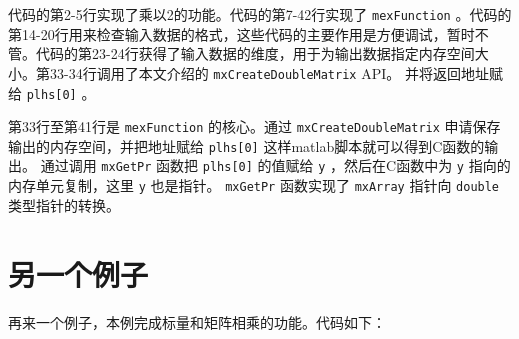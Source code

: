 \documentclass[10pt,a4paper,UTF8]{article}
\begin{document}
代码的第2-5行实现了乘以2的功能。代码的第7-42行实现了 \texttt{mexFunction} 。代码的第14-20行用来检查输入数据的格式，这些代码的主要作用是方便调试，暂时不管。代码的第23-24行获得了输入数据的维度，用于为输出数据指定内存空间大小。第33-34行调用了本文介绍的 \texttt{mxCreateDoubleMatrix} API。 并将返回地址赋给 \texttt{plhs[0]} 。

第33行至第41行是 \texttt{mexFunction} 的核心。通过 \texttt{mxCreateDoubleMatrix} 申请保存输出的内存空间，并把地址赋给 \texttt{plhs[0]} 这样matlab脚本就可以得到C函数的输出。 通过调用 \texttt{mxGetPr} 函数把 \texttt{plhs[0]} 的值赋给 \texttt{y} ，然后在C函数中为 \texttt{y} 指向的内存单元复制，这里 \texttt{y} 也是指针。 \texttt{mxGetPr} 函数实现了 \texttt{mxArray} 指针向 \texttt{double} 类型指针的转换。
\section{另一个例子}
\label{sec:orgheadline6}


再来一个例子，本例完成标量和矩阵相乘的功能。代码如下：
\end{document}
